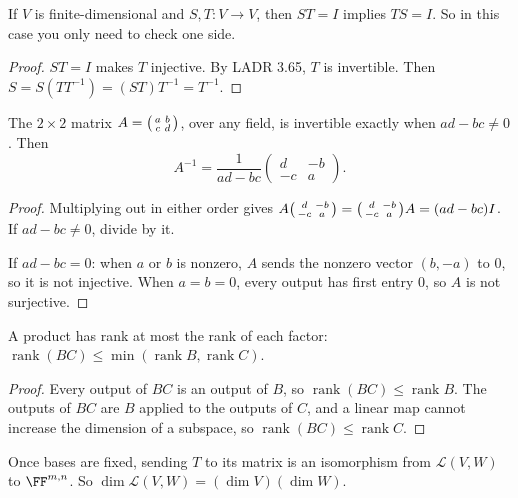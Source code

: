 \documentclass[11pt]{scrartcl}
\newcommand{\LL}{\mathcal L}
\begin{document}
\begin{corollary*}[Prop.~33]
  If $V$ is finite-dimensional and $S,T\colon V\to V$, then $ST=I$ implies $TS=I$.
  So in this case you only need to check one side.
\end{corollary*}
\begin{proof}
  $ST=I$ makes $T$ injective. By LADR 3.65, $T$ is invertible. Then $S=S(TT^{-1})=(ST)T^{-1}=T^{-1}$.
\end{proof}

\begin{proposition*}[HW4 P1]
  The $2\times2$ matrix $A=\begin{psmallmatrix}a&b\\c&d\end{psmallmatrix}$, over any field, is invertible exactly when $ad-bc\ne0$. Then
  \[ A^{-1}=\frac{1}{ad-bc}\begin{pmatrix}d&-b\\-c&a\end{pmatrix}. \]
\end{proposition*}
\begin{proof}
  Multiplying out in either order gives $A\begin{psmallmatrix}d&-b\\-c&a\end{psmallmatrix}=\begin{psmallmatrix}d&-b\\-c&a\end{psmallmatrix}A=(ad-bc)I$. If $ad-bc\ne0$, divide by it.

  If $ad-bc=0$: when $a$ or $b$ is nonzero, $A$ sends the nonzero vector $(b,-a)$ to $0$, so it is not injective. When $a=b=0$, every output has first entry $0$, so $A$ is not surjective.
\end{proof}

\begin{proposition*}[HW4 P4]
  A product has rank at most the rank of each factor: $\operatorname{rank}(BC)\le\min(\operatorname{rank}B,\operatorname{rank}C)$.
\end{proposition*}
\begin{proof}
  Every output of $BC$ is an output of $B$, so $\operatorname{rank}(BC)\le\operatorname{rank}B$.
  The outputs of $BC$ are $B$ applied to the outputs of $C$, and a linear map cannot increase the dimension of a subspace, so $\operatorname{rank}(BC)\le\operatorname{rank}C$.
\end{proof}

\begin{proposition*}[Prop.~26]
  Once bases are fixed, sending $T$ to its matrix is an isomorphism from $\LL(V,W)$ to $\FF^{m,n}$.
  So $\dim\LL(V,W)=(\dim V)(\dim W)$.
\end{proposition*}
\end{document}
